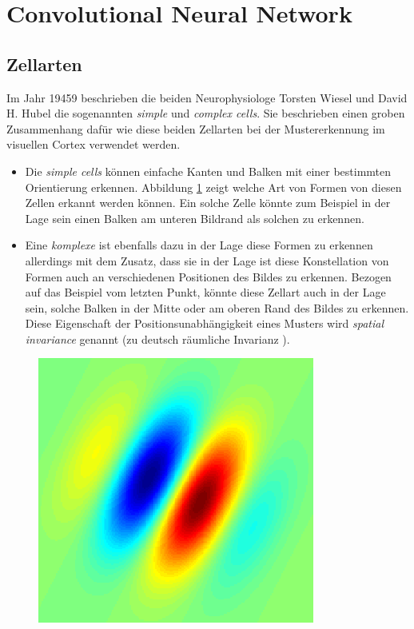 \section{Convolutional Neural Network}

\subsection{Zellarten} 
Im Jahr 19459 beschrieben die beiden Neurophysiologe Torsten Wiesel und David H. Hubel die sogenannten \emph{simple} und \emph{complex cells}. Sie beschrieben einen groben Zusammenhang dafür wie diese beiden Zellarten bei der Mustererkennung im visuellen Cortex verwendet werden. 

\begin{itemize}
\item Die \emph{simple cells} können einfache Kanten und Balken mit einer bestimmten Orientierung erkennen. Abbildung \ref{fig:gabor_filter} zeigt welche Art von Formen von diesen Zellen erkannt werden können. Ein solche Zelle könnte zum Beispiel in der Lage sein einen Balken am unteren Bildrand als solchen zu erkennen. 

\item Eine \emph{komplexe} ist ebenfalls dazu in der Lage diese Formen zu erkennen allerdings mit dem Zusatz, dass sie in der Lage ist diese Konstellation von Formen auch an verschiedenen Positionen des Bildes zu erkennen. Bezogen auf das Beispiel vom letzten Punkt, könnte diese Zellart auch in der Lage sein, solche Balken in der Mitte oder am oberen Rand des Bildes zu erkennen. Diese Eigenschaft der Positionsunabhängigkeit eines Musters wird \emph{spatial invariance} genannt (zu deutsch \glqq räumliche Invarianz \grqq ).
\end{itemize}

\begin{figure}[!htb]
	\centering
	\includegraphics[width=.5\linewidth]{img/gabor_filter}
	\label{fig:gabor_filter}
\end{figure}

